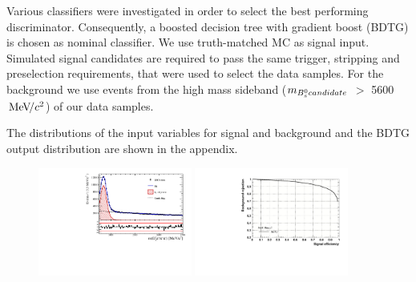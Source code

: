 Various classifiers were investigated in order to select the best performing discriminator. Consequently, a boosted decision tree with gradient boost (BDTG) is chosen as nominal classifier. 
We use truth-matched MC as signal input. 
Simulated signal candidates are required to pass the same trigger, stripping and preselection requirements, that were used to select the data samples.  
For the background we use events from the high mass sideband ($m_{{{B}^0_{s}} candidate}$ $>$ 5600 ${\mathrm{\,Me\kern -0.1em V\!/}c^2}$) of our data samples. 

The distributions of the input variables for signal and background and 
the BDTG output distribution are shown in the appendix.

\begin{figure}[h]
\centering
\includegraphics[height=!,width=0.45\textwidth]{figs/MassFit/norm_preselected_pull.pdf}
\includegraphics[height=!,width=0.45\textwidth]{figs/TMVA/BDTG_Data_run1_t0_even/rejBvsS.pdf}
\caption{}
\label{fig:}
\end{figure}


